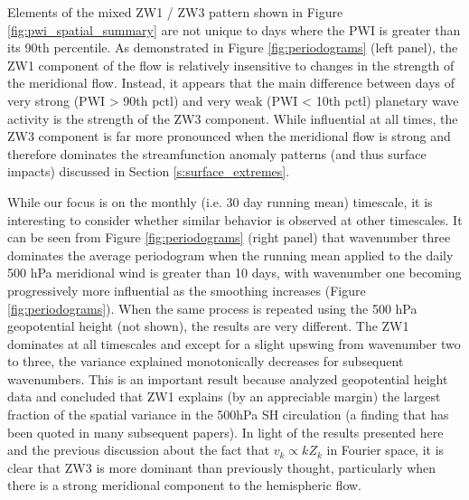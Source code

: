 Elements of the mixed ZW1 / ZW3 pattern shown in Figure \ref{fig:pwi_spatial_summary} are not unique to days where the PWI is greater than its 90th percentile. As demonstrated in Figure \ref{fig:periodograms} (left panel), the ZW1 component of the flow is relatively insensitive to changes in the strength of the meridional flow. Instead, it appears that the main difference between days of very strong (PWI > 90th pctl) and very weak (PWI < 10th pctl) planetary wave activity is the strength of the ZW3 component. While influential at all times, the ZW3 component is far more pronounced when the meridional flow is strong and therefore dominates the streamfunction anomaly patterns (and thus surface impacts) discussed in Section \ref{s:surface_extremes}.

While our focus is on the monthly (i.e. 30 day running mean) timescale, it is interesting to consider whether similar behavior is observed at other timescales. It can be seen from Figure \ref{fig:periodograms} (right panel) that wavenumber three dominates the average periodogram when the running mean applied to the daily 500 hPa meridional wind is greater than 10 days, with wavenumber one becoming progressively more influential as the smoothing increases (Figure \ref{fig:periodograms}). When the same process is repeated using the 500 hPa geopotential height (not shown), the results are very different. The ZW1 dominates at all timescales and except for a slight upswing from wavenumber two to three, the variance explained monotonically decreases for subsequent wavenumbers. This is an important result because \citet{vanLoon1972} analyzed geopotential height data and concluded that ZW1 explains (by an appreciable margin) the largest fraction of the spatial variance in the 500hPa SH circulation (a finding that has been quoted in many subsequent papers). In light of the results presented here and the previous discussion about the fact that $v_k \propto k Z_k$ in Fourier space, it is clear that ZW3 is more dominant than previously thought, particularly when there is a strong meridional component to the hemispheric flow. 